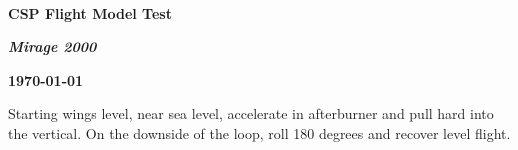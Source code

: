 \documentclass[12pt, letterpaper]{article}
\begin{document}
~

\vspace{1in}

\textbf{\huge CSP Flight Model Test}

\medskip

\textbf{\textsl{\Large Mirage 2000}}

\smallskip

\textbf{\today}

\bigskip
\bigskip

Starting wings level, near sea level, accelerate in afterburner and pull hard into the vertical.  On the downside of the loop, roll 180 degrees and recover level flight. 



\end{document}
